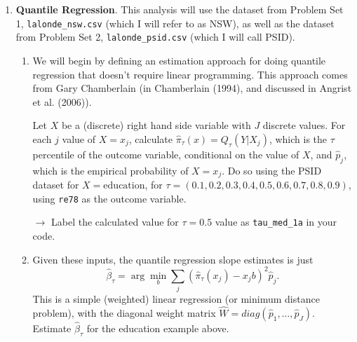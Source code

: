 \documentclass[11pt, a4paper]{article}
\begin{document}
\begin{enumerate}
\item \textbf{Quantile Regression}. This analysis will use the dataset
  from Problem Set 1, \texttt{lalonde\_nsw.csv} (which I will refer to
  as NSW), as well as the dataset from Problem Set 2,
  \texttt{lalonde\_psid.csv} (which I will call PSID).
  \begin{enumerate}
  \item We will begin by defining an estimation approach for doing
    quantile regression that doesn't require linear programming. This
    approach comes from Gary Chamberlain (in Chamberlain (1994), and
    discussed in Angrist et al. (2006)). 

    Let $X$ be a (discrete) right hand side variable with $J$ discrete
    values.  For each $j$ value of $X = x_{j}$, calculate
    $\hat{\pi}_{\tau}(x) = Q_{\tau}(Y|X_{j})$, which is the $\tau$
    percentile of the outcome variable, conditional on the value of
    $X$, and $\hat{p}_{j}$, which is the empirical probability of
    $X = x_{j}$.  Do so using the PSID dataset for
    $X = \textrm{education}$, for
    $\tau = (0.1,0.2,0.3,0.4,0.5,0.6,0.7,0.8,0.9)$, using
    \texttt{re78} as the outcome variable.

\hspace{10pt} $\rightarrow$ Label the calculated value for  $\tau=0.5$ value as \texttt{tau\_med\_1a} in your code.
  \item Given these inputs, the quantile regression slope
    estimates is just
    $$ \hat{\beta}_{\tau} = \arg\min_{b} \sum_{j} (\hat{\pi}_{\tau}(x_{j}) - x_{j}b)^{2}\hat{p}_{j}.$$
    This is a simple (weighted) linear regression (or minimum distance
    problem), with the diagonal weight matrix
    $\hat{W} = diag(\hat{p}_{1}, \ldots, \hat{p}_{J})$. Estimate
    $\hat{\beta}_{\tau}$ for the education example above.


\end{enumerate}
\end{enumerate}
\end{document}
